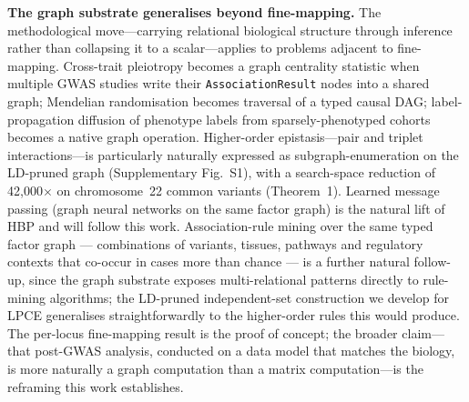 \textbf{The graph substrate generalises beyond fine-mapping.}
The methodological move---carrying relational biological
structure through inference rather than collapsing it to a
scalar---applies to problems adjacent to
fine-mapping\cite{ulirsch2021fine,schaid2018genome}. Cross-trait
pleiotropy becomes a graph centrality statistic when multiple
GWAS studies write their \texttt{AssociationResult} nodes into a
shared graph; Mendelian randomisation becomes traversal of a
typed causal DAG; label-propagation diffusion of phenotype
labels from sparsely-phenotyped cohorts becomes a native graph
operation. Higher-order epistasis---pair and triplet
interactions---is particularly naturally expressed as
subgraph-enumeration on the LD-pruned graph
(Supplementary Fig.~S1), with a search-space reduction of
42{,}000$\times$ on chromosome~22 common variants (Theorem~1).
Learned message passing (graph neural networks on the same
factor graph) is the natural lift of HBP and will follow this
work. Association-rule mining over the same typed factor graph ---
combinations of variants, tissues, pathways and regulatory contexts
that co-occur in cases more than chance --- is a further natural
follow-up, since the graph substrate exposes multi-relational
patterns directly to rule-mining algorithms; the LD-pruned
independent-set construction we develop for LPCE generalises
straightforwardly to the higher-order rules this would produce.
The per-locus fine-mapping result is the proof of
concept; the broader claim---that post-GWAS analysis, conducted
on a data model that matches the biology, is more naturally a
graph computation than a matrix computation---is the reframing
this work establishes.
